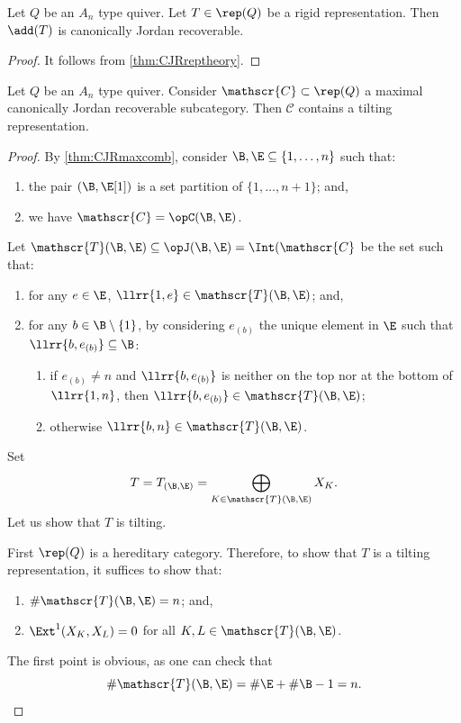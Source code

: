  \begin{prop} \label{prop:addTCJR}
    Let $Q$ be an $A_n$ type quiver. Let $T \in \rep(Q)$ be a rigid representation. Then $\add(T)$ is canonically Jordan recoverable.
\end{prop}

\begin{proof}
   It follows from \cref{thm:CJRreptheory}.
\end{proof}

\begin{prop} \label{prop:existtiltmaxCJR}
    Let $Q$ be an $A_n$ type quiver. Consider $\mathscr{C} \subset \rep(Q)$ a maximal canonically Jordan recoverable subcategory. Then $\mathscr{C}$ contains a tilting representation.
\end{prop}

\begin{proof}
    By \cref{thm:CJRmaxcomb}, consider $\B,\E \subseteq \{1,\ldots,n\}$ such that: \begin{enumerate}[label=$\bullet$,itemsep=1mm]
        \item the pair $(\B,\E[1])$ is a set partition of $\{1,\ldots,n+1\}$; and, 
        \item we have $\mathscr{C} = \opC(\B,\E)$.
    \end{enumerate}  
    Let $\mathscr{T}(\B, \E) \subseteq \opJ(\B,\E) = \Int(\mathscr{C}$ be the set such that: 
    \begin{enumerate}[label=$\bullet$, itemsep=1mm]
        \item for any $e \in \E$, $\llrr{1,e} \in \mathscr{T}(\B,\E)$; and,
        \item for any $b \in \B \setminus \{1\}$, by considering $e_{(b)}$ the unique element in $\E$ such that $\llrr{b,e_{(b)}} \subseteq \B$:
        \begin{enumerate}[label=$\bullet$,itemsep=1mm]
            \item if $e_{(b)} \neq n$ and $\llrr{b,e_{(b)}}$ is neither on the top nor at the bottom of $\llrr{1,n}$, then $\llrr{b,e_{(b)}} \in \mathscr{T}(\B,\E)$; 
            \item otherwise $\llrr{b,n} \in \mathscr{T}(\B,\E)$.
        \end{enumerate}
    \end{enumerate} Set \[T = T_{(\B,\E)} = \bigoplus_{K \in \mathscr{T}(\B,\E)} X_{K}.\]
    Let us show that $T$ is tilting.
    
    First $\rep(Q)$ is a hereditary category. Therefore, to show that $T$ is a tilting representation, it suffices to show that:
    \begin{enumerate}[label=$\bullet$, itemsep=1mm]
        \item $\# \mathscr{T}(\B,\E) = n$; and,
        \item  $\Ext^1(X_K, X_L) = 0$ for all $K,L \in \mathscr{T}(\B,\E)$.
    \end{enumerate}
    The first point is obvious, as one can check that
    \[\#\mathscr{T}(\B,\E) = \#\E + \#\B - 1 = n.\]  
    

\end{proof}
